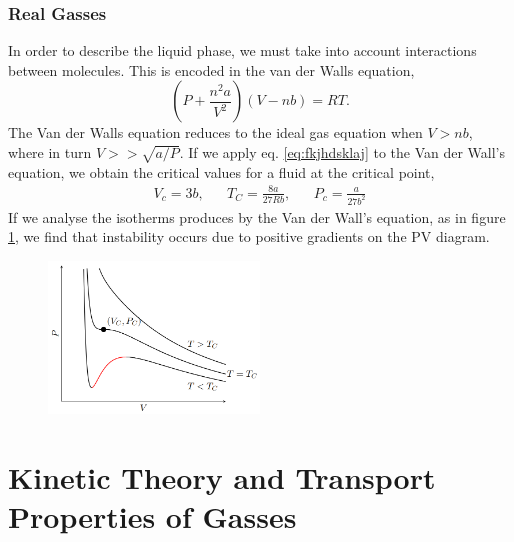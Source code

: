 \documentclass{book}
\begin{document}
\subsection{Real Gasses}
In order to describe the liquid phase, we must take into account interactions between molecules. This is encoded in the van der Walls equation,
\begin{equation}
	\boxed{\left(P + \frac{n^2a}{V^2}\right)\left(V - nb\right) = RT}.
\end{equation}
The Van der Walls equation reduces to the ideal gas equation when $V > nb$, where in turn $V >> \sqrt{a/P}$. If we apply eq. \eqref{eq:fkjhdsklaj} to the Van der Wall's equation, we obtain the critical values for a fluid at the critical point,
\begin{align}
	V_c = 3b, && T_C = \frac{8a}{27Rb}, && P_c = \frac{a}{27b^2}
\end{align}
If we analyse the isotherms produces by the Van der Wall's equation, as in figure \ref{fig:pv van}, we find that instability occurs due to positive gradients on the PV diagram.
\begin{figure}
	\centering
	\includegraphics[width=0.5\textwidth]{pv van.png}
	\caption{}
	\label{fig:pv van}
\end{figure}
\chapter{Kinetic Theory and Transport Properties of Gasses}
\end{document}

